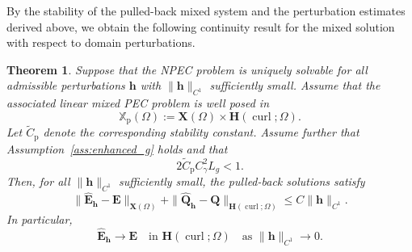 \documentclass[10pt,a4paper]{amsart}
\newtheorem{theo}{Theorem}[section]
\numberwithin{equation}{section}
\begin{document}
By the stability of the pulled-back mixed system and the perturbation estimates
derived above, we obtain the following continuity result for the mixed solution
with respect to domain perturbations.

\begin{theo}\label{thm:continuity_p_mixed}
Suppose that the NPEC problem is uniquely solvable for all admissible
perturbations \(\mathbf h\) with \(\|\mathbf h\|_{C^1}\) sufficiently small.
Assume that the associated linear mixed PEC problem is well posed in
\[
\mathbb X_{\mathrm p}(\Omega)
:=
\mathbf X(\Omega)\times \mathbf H(\operatorname{curl};\Omega).
\]
Let \(\widetilde C_{\mathrm p}\) denote the corresponding stability constant.
Assume further that Assumption~\ref{ass:enhanced_g} holds and that
\[
2\widetilde C_{\mathrm p}C_\gamma^2L_g<1.
\]
Then, for all \(\|\mathbf h\|_{C^1}\) sufficiently small, the pulled-back
solutions satisfy
\[
\|\widehat{\mathbf E}_{\mathbf h}-\mathbf E\|_{\mathbf X(\Omega)}
+
\|\widehat{\mathbf Q}_{\mathbf h}-\mathbf Q\|_{\mathbf H(\operatorname{curl};\Omega)}
\le
C\|\mathbf h\|_{C^1}.
\]
In particular,
\[
\widehat{\mathbf E}_{\mathbf h}\to\mathbf E
\quad\text{in }\mathbf H(\operatorname{curl};\Omega)
\quad\text{as }\|\mathbf h\|_{C^1}\to0.
\]
\end{theo}
\end{document}
